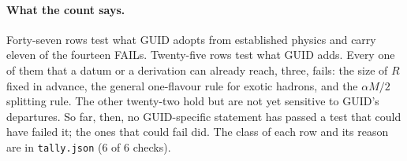 \paragraph{What the count says.} Forty-seven rows test what GUID adopts from established physics and carry eleven of the fourteen FAILs.
Twenty-five rows test what GUID adds. Every one of them that a datum or a derivation can already reach, three, fails: the size of $R$
fixed in advance, the general one-flavour rule for exotic hadrons, and the $\alpha M/2$ splitting rule. The other twenty-two hold but are
not yet sensitive to GUID's departures. So far, then, no GUID-specific statement has passed a test that could have failed it; the ones
that could fail did. The class of each row and its reason
are in \texttt{tally.json} (6 of 6 checks).
